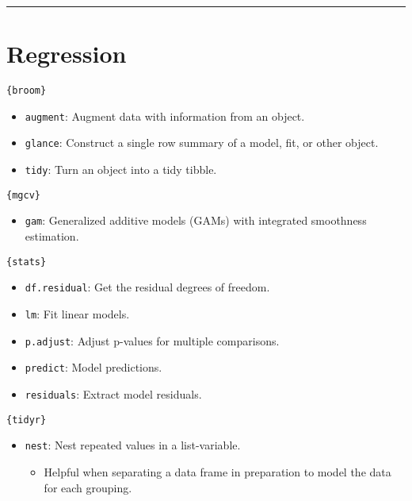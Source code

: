 \documentclass[]{book}
\providecommand{\tightlist}{%
  \setlength{\itemsep}{0pt}\setlength{\parskip}{0pt}}
\begin{document}
\begin{center}\rule{0.5\linewidth}{\linethickness}\end{center}

\hypertarget{regression}{%
\section{Regression}\label{regression}}

\texttt{\{broom\}}

\begin{itemize}
\tightlist
\item
  \texttt{augment}: Augment data with information from an object.
\item
  \texttt{glance}: Construct a single row summary of a model, fit, or other object.
\item
  \texttt{tidy}: Turn an object into a tidy tibble.
\end{itemize}

\texttt{\{mgcv\}}

\begin{itemize}
\tightlist
\item
  \texttt{gam}: Generalized additive models (GAMs) with integrated smoothness estimation.
\end{itemize}

\texttt{\{stats\}}

\begin{itemize}
\tightlist
\item
  \texttt{df.residual}: Get the residual degrees of freedom.
\item
  \texttt{lm}: Fit linear models.
\item
  \texttt{p.adjust}: Adjust p-values for multiple comparisons.
\item
  \texttt{predict}: Model predictions.
\item
  \texttt{residuals}: Extract model residuals.
\end{itemize}

\texttt{\{tidyr\}}

\begin{itemize}
\tightlist
\item
  \texttt{nest}: Nest repeated values in a list-variable.

  \begin{itemize}
  \tightlist
  \item
    Helpful when separating a data frame in preparation to model the data for each grouping.
  \end{itemize}
\end{itemize}
\end{document}

